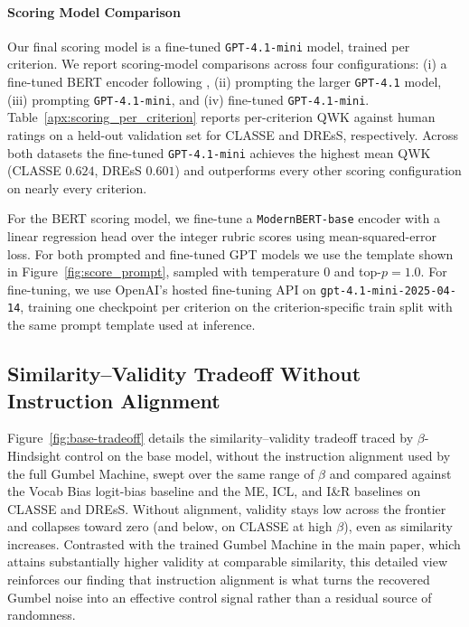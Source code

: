 \documentclass[letterpaper]{article} %
\begin{document}
\paragraph{Scoring Model Comparison} Our final scoring model is a fine-tuned \texttt{GPT-4.1-mini} model, trained per criterion. We report scoring-model comparisons across four configurations: (i) a fine-tuned BERT encoder following \cite{fernandez_automated_2022}, (ii) prompting the larger \texttt{GPT-4.1} model, (iii) prompting \texttt{GPT-4.1-mini}, and (iv) fine-tuned \texttt{GPT-4.1-mini}. Table~\ref{apx:scoring_per_criterion} reports per-criterion QWK against human ratings on a held-out validation set for CLASSE and DREsS, respectively. Across both datasets the fine-tuned \texttt{GPT-4.1-mini} achieves the highest mean QWK (CLASSE $0.624$, DREsS $0.601$) and outperforms every other scoring configuration on nearly every criterion.

For the BERT scoring model, we fine-tune a \texttt{ModernBERT-base} encoder with a linear regression head over the integer rubric scores using mean-squared-error loss. For both prompted and fine-tuned GPT models we use the template shown in Figure~\ref{fig:score_prompt}, sampled with temperature $0$ and top-$p=1.0$. For fine-tuning, we use OpenAI's hosted fine-tuning API on \texttt{gpt-4.1-mini-2025-04-14}, training one checkpoint per criterion on the criterion-specific train split with the same prompt template used at inference.

\subsection{Similarity–Validity Tradeoff Without Instruction Alignment} \label{apx:base-tradeoff}

Figure~\ref{fig:base-tradeoff} details the similarity–validity tradeoff traced by $\beta$-Hindsight control on the base model, without the instruction alignment used by the full Gumbel Machine, swept over the same range of $\beta$ and compared against the Vocab Bias logit-bias baseline and the ME, ICL, and I\&R baselines on CLASSE and DREsS. Without alignment, validity stays low across the frontier and collapses toward zero (and below, on CLASSE at high $\beta$), even as similarity increases. Contrasted with the trained Gumbel Machine in the main paper, which attains substantially higher validity at comparable similarity, this detailed view reinforces our finding that instruction alignment is what turns the recovered Gumbel noise into an effective control signal rather than a residual source of randomness.
\end{document}
